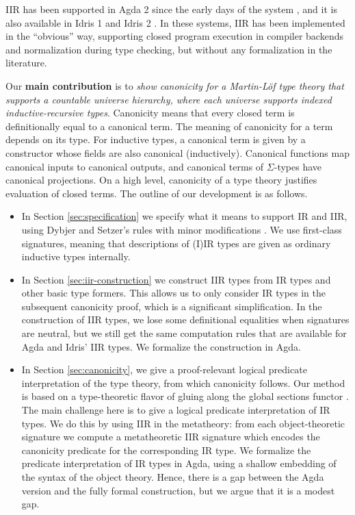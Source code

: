 \documentclass[acmsmall,screen,review,anonymous]{acmart}
\begin{document}
IIR has been supported in Agda 2 since the early days of the system \cite{DBLP:conf/tphol/BoveDN09},
and it is also available in Idris 1 \cite{DBLP:journals/jfp/Brady13} and Idris 2
\cite{DBLP:conf/ecoop/Brady21}. In these systems, IIR has been implemented in the ``obvious'' way,
supporting closed program execution in compiler backends and normalization during type checking, but
without any formalization in the literature.

Our \textbf{main contribution} is to \emph{show canonicity for a Martin-Löf type theory that
supports a countable universe hierarchy, where each universe supports indexed inductive-recursive
types}. Canonicity means that every closed term is definitionally equal to a canonical term. The
meaning of canonicity for a term depends on its type. For inductive types, a canonical term is
given by a constructor whose fields are also canonical (inductively). Canonical functions map canonical inputs
to canonical outputs, and canonical terms of $\Sigma$-types have canonical projections. On a high level, canonicity
of a type theory justifies evaluation of closed terms. The outline of our development is as follows.

\begin{itemize}
\item In Section \ref{sec:specification} we specify what it means to support IR and IIR, using
  Dybjer and Setzer's rules with minor modifications \cite{DBLP:journals/jlp/DybjerS06,DBLP:journals/apal/DybjerS03}. We use
  first-class signatures, meaning that descriptions of (I)IR types are given as ordinary inductive
  types internally.
\item In Section \ref{sec:iir-construction} we construct IIR types from IR types and other basic
  type formers. This allows us to only consider IR types in the subsequent canonicity proof, which
  is a significant simplification. In the construction of IIR types, we lose some definitional
  equalities when signatures are neutral, but we still get the same computation rules that are
  available for Agda and Idris' IIR types. We formalize the construction in Agda.
\item In Section \ref{sec:canonicity}, we give a proof-relevant logical predicate interpretation of
  the type theory, from which canonicity follows. Our method is based on a type-theoretic flavor of
  gluing along the global sections functor \cite{gluing,coquand2018canonicity}. The main challenge
  here is to give a logical predicate interpretation of IR types. We do this by using IIR in the
  metatheory: from each object-theoretic signature we compute a metatheoretic IIR signature which
  encodes the canonicity predicate for the corresponding IR type.  We formalize the predicate
  interpretation of IR types in Agda, using a shallow embedding of the syntax of the object
  theory. Hence, there is a gap between the Agda version and the fully formal construction, but we
  argue that it is a modest gap.
\end{itemize}
\end{document}
